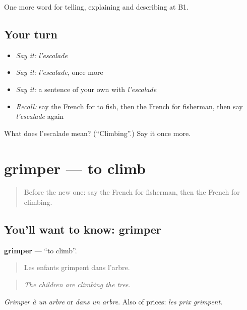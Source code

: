 \begin{grammarlens}[title={What you've built}]
One more word for telling, explaining and describing at B1.
\end{grammarlens}

\subsection*{Your turn}
\begin{itemize}
\raggedright
  \item \emph{Say it:} \emph{l'escalade}
  \item \emph{Say it:} \emph{l'escalade}, once more
  \item \emph{Say it:} a sentence of your own with \emph{l'escalade}
  \item \emph{Recall:} say the French for to fish, then the French for fisherman, then say \emph{l'escalade} again
\end{itemize}

\begin{tcolorbox}[breakable,colback=teal!4,colframe=teal!35!black,title={Before you move on}]
What does l'escalade mean? (\textquotedblleft{}Climbing\textquotedblright{}.) Say it once more.
\end{tcolorbox}
\section[grimper]{grimper — to climb}

\label{lesson:FR-C498-grimper}



\begin{quote}
Before the new one: say the French for fisherman, then the French for climbing.
\end{quote}

\subsection*{You'll want to know: grimper}
\textbf{grimper} — \textquotedblleft{}to climb\textquotedblright{}.

\begin{quote}
Les enfants grimpent dans l'arbre.
\end{quote}

\begin{quote}
\emph{The children are climbing the tree.}
\end{quote}

\emph{Grimper à un arbre} or \emph{dans un arbre}. Also of prices: \emph{les prix grimpent}.

